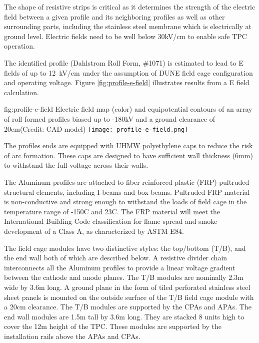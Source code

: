 The shape of resistive strips is critical as it determines the strength of the electric field between a given profile and its neighboring profiles as well as other surrounding parts, including the stainless steel membrane which is electrically at ground level. Electric fields need to be well below 30kV/cm to enable safe TPC operation.

The identified profile (Dahlstrom Roll Form, \#1071) is estimated to lead to E fields of up to 12~kV/cm under the assumption of DUNE field cage configuration 
and operating voltage. Figure \ref{fig:profile-e-field} illustrates results from a E field calculation.

\begin{dunefigure}
{fig:profile-e-field}
{Electric field map (color) and equipotential contours of an array of roll formed profiles biased up to -180kV and a ground clearance of 20cm(Credit: CAD model)} \texttt{[image: profile-e-field.png]}
\end{dunefigure}

The profiles ends are equipped with UHMW polyethylene caps to reduce the risk of arc formation.  These caps are designed to have sufficient wall thickness (6mm) to withstand the full voltage across their walls.

The Aluminum profiles are attached to fiber-reinforced plastic (FRP) pultruded structural elements, including I-beams and box beams.  
Pultruded FRP material is non-conductive and strong enough to withstand the loads of field cage in the temperature range of -150C and 23C.
The FRP material will meet the International Building Code classification for flame spread and smoke development of a Class A, as characterized by ASTM E84.  


The field cage modules have two distinctive styles: the top/bottom (T/B), and the end wall both of which are described below. 
A resistive divider chain interconnects all the Aluminum profiles to provide a linear voltage gradient between the cathode and anode planes.  The T/B modules are nominally 2.3m wide by 3.6m long. A ground plane in the form of tiled perforated stainless steel sheet panels is mounted on the outside surface of the T/B field cage module with a 20cm clearance. The T/B modules are supported by the CPAs and APAs. The end wall modules are 1.5m tall by 3.6m long. They are stacked 8 units high to cover the 12m height of the TPC.  These modules are supported by the installation rails above the APAs and CPAs.   

